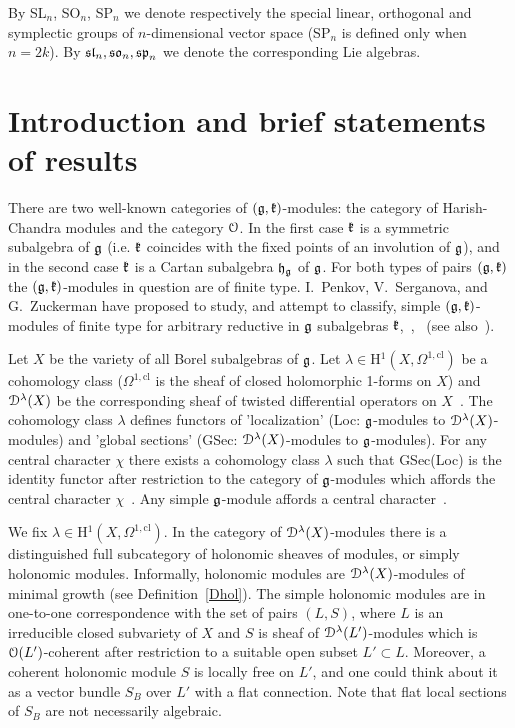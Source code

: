 \documentclass[12pt]{amsart}
\theoremstyle{definition}\newtheorem{theorem}{Theorem}[section]
\theoremstyle{definition}\newtheorem{definition}[proposition]{Definition}
\theoremstyle{remark}\newtheorem{example}[proposition]{Example}
\begin{document}
By SL$_n$, SO$_n$, SP$_n$ we denote respectively the special linear, orthogonal and symplectic groups of $n$-dimensional vector space (SP$_n$ is defined only when $n=2k$). By $\frak{sl}_n, \frak{so}_n, \frak{sp}_n$ we denote the corresponding Lie algebras.
\newpage\section{Introduction and brief statements of results}\label{Stro}
There are two well-known categories of $(\frak g, \frak k)$-modules: the category of Harish-Chandra modules and the category $\EuScript O$. In the first case $\frak k$ is a symmetric subalgebra of $\frak g$ (i.e. $\frak k$ coincides with the fixed points of an involution of $\frak g$), and in the second case $\frak k$ is a Cartan subalgebra $\frak h_\frak g$ of $\frak g$. For both types of pairs $(\frak g, \frak k)$ the $(\frak g, \frak k)$-modules in question are of finite type. I.~Penkov, V.~Serganova, and G.~Zuckerman have proposed to study, and attempt to classify, simple $(\frak g, \frak k)$-modules of finite type for arbitrary reductive in $\frak g$ subalgebras $\frak k$,~\cite{PSZ},~\cite{PZ} (see also~\cite{Mi}).

Let $X$ be the variety of all Borel subalgebras of $\frak g$. Let $\lambda\in$H$^1(X,\Omega^{1,\mathrm{cl}})$ be a cohomology class ($\Omega^{1,\mathrm{cl}}$ is the sheaf of closed holomorphic 1-forms on $X$) and $\EuScript D^\lambda(X)$ be the corresponding sheaf of twisted differential operators on $X$~\cite{Be}. The cohomology class $\lambda$ defines functors of 'localization' (Loc: $\frak g$-modules to $\EuScript D^\lambda(X)$-modules) and 'global sections' (GSec: $\EuScript D^\lambda(X)$-modules to $\frak g$-modules). For any central character $\chi$ there exists a cohomology class $\lambda$ such that GSec(Loc) is the identity functor after restriction to the category of $\frak g$-modules which affords the central character $\chi$~\cite{BeBe}. Any simple $\frak g$-module affords a central character~\cite{Dix}.

We fix $\lambda\in$H$^1(X,\Omega^{1,\mathrm{cl}})$. In the category of $\EuScript D^\lambda(X)$-modules there is a distinguished full subcategory of holonomic sheaves of modules, or simply holonomic modules. Informally, holonomic modules are $\EuScript D^\lambda(X)$-modules of minimal growth (see Definition~\ref{Dhol}). The simple holonomic modules are in one-to-one correspondence with the set of pairs $(L ,S)$, where $L$ is an irreducible closed subvariety of $X$ and $S$ is sheaf of $\EuScript D^\lambda(L')$-modules which is $\EuScript O(L')$-coherent after restriction to a suitable open subset $L'\subset L$. Moreover, a coherent holonomic module $S$ is locally free on $L'$, and one could think about it as a vector bundle $S_B$ over $L'$ with a flat connection. Note that flat local sections of $S_B$ are not necessarily algebraic.
\end{document}
